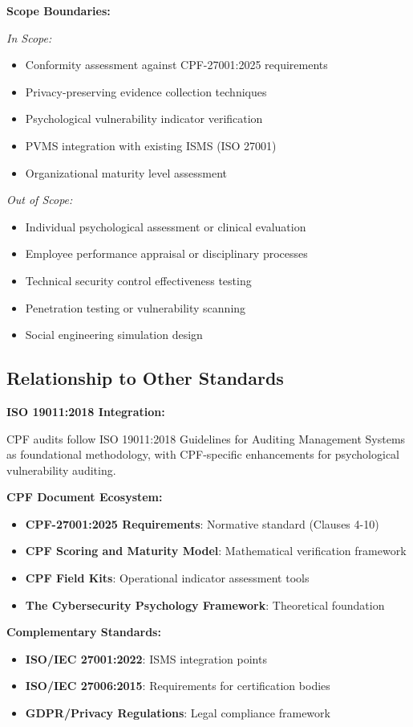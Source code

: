 \documentclass[11pt,a4paper]{article}
\begin{document}
\textbf{Scope Boundaries:}

\textit{In Scope:}
\begin{itemize}
\item Conformity assessment against CPF-27001:2025 requirements
\item Privacy-preserving evidence collection techniques
\item Psychological vulnerability indicator verification
\item PVMS integration with existing ISMS (ISO 27001)
\item Organizational maturity level assessment
\end{itemize}

\textit{Out of Scope:}
\begin{itemize}
\item Individual psychological assessment or clinical evaluation
\item Employee performance appraisal or disciplinary processes
\item Technical security control effectiveness testing
\item Penetration testing or vulnerability scanning
\item Social engineering simulation design
\end{itemize}

\subsection{Relationship to Other Standards}

\textbf{ISO 19011:2018 Integration:}

CPF audits follow ISO 19011:2018 Guidelines for Auditing Management Systems as foundational methodology, with CPF-specific enhancements for psychological vulnerability auditing.

\textbf{CPF Document Ecosystem:}
\begin{itemize}
\item \textbf{CPF-27001:2025 Requirements}: Normative standard (Clauses 4-10)
\item \textbf{CPF Scoring and Maturity Model}: Mathematical verification framework
\item \textbf{CPF Field Kits}: Operational indicator assessment tools
\item \textbf{The Cybersecurity Psychology Framework}: Theoretical foundation
\end{itemize}

\textbf{Complementary Standards:}
\begin{itemize}
\item \textbf{ISO/IEC 27001:2022}: ISMS integration points
\item \textbf{ISO/IEC 27006:2015}: Requirements for certification bodies
\item \textbf{GDPR/Privacy Regulations}: Legal compliance framework
\end{itemize}
\end{document}
